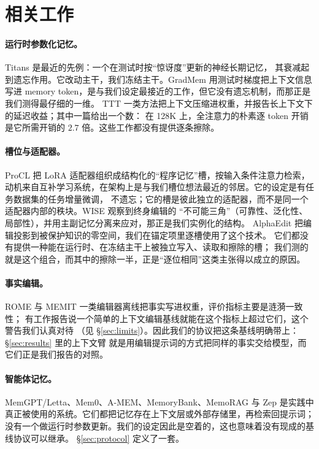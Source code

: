 \documentclass[11pt]{ctexart}
\begin{document}
\section{相关工作}
\label{sec:related}

\paragraph{运行时参数化记忆。}Titans 是最近的先例：一个在测试时按“惊讶度”更新的神经长期记忆，
其衰减起到遗忘作用。它改动主干，我们冻结主干。GradMem 用测试时梯度把上下文信息写进
memory token，是与我们设定最接近的工作，但它没有遗忘机制，而那正是我们测得最仔细的一维。
TTT 一类方法把上下文压缩进权重，并报告长上下文下的延迟收益；其中一篇给出一个数：
在 128K 上，全注意力的朴素逐 token 开销是它所需开销的 $2.7$ 倍。这些工作都没有提供逐条擦除。

\paragraph{槽位与适配器。}ProCL 把 LoRA 适配器组织成结构化的“程序记忆”槽，按输入条件注意力检索，
动机来自互补学习系统，在架构上是与我们槽位想法最近的邻居。它的设定是有任务数据集的任务增量微调，
不遗忘；它的槽是彼此独立的适配器，而不是同一个适配器内部的秩块。WISE 观察到终身编辑的
“不可能三角”（可靠性、泛化性、局部性），并用主副记忆分离来应对，那正是我们实例化的结构。
AlphaEdit 把编辑投影到被保护知识的零空间，我们在锚定项里逐槽使用了这个技术。
它们都没有提供一种能在运行时、在冻结主干上被独立写入、读取和擦除的槽；
我们测的就是这个组合，而其中的擦除一半，正是“逐位相同”这类主张得以成立的原因。

\paragraph{事实编辑。}ROME 与 MEMIT 一类编辑器离线把事实写进权重，评价指标主要是涟漪一致性；
有工作报告说一个简单的上下文编辑基线就能在这个指标上超过它们，这个警告我们认真对待
（见 §\ref{sec:limits}）。因此我们的协议把这条基线明确带上：§\ref{sec:results} 里的上下文臂
就是用编辑提示词的方式把同样的事实交给模型，而它们正是我们报告的对照。

\paragraph{智能体记忆。}MemGPT/Letta、Mem0、A-MEM、MemoryBank、MemoRAG 与 Zep 是实践中
真正被使用的系统。它们都把记忆存在上下文层或外部存储里，再检索回提示词；
没有一个做运行时参数更新。我们的设定因此是空着的，这也意味着没有现成的基线协议可以继承。
§\ref{sec:protocol} 定义了一套。
\end{document}
